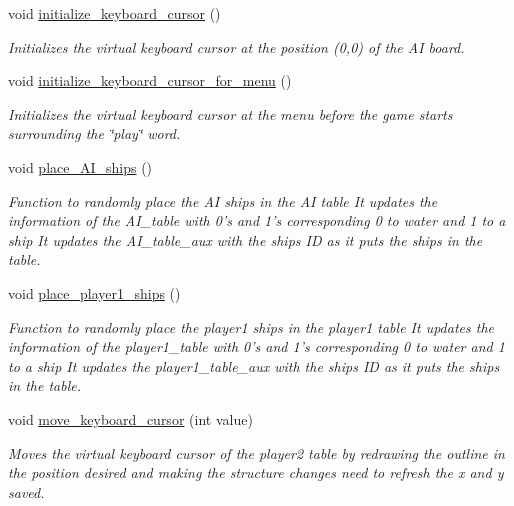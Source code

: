 \begin{DoxyCompactItemize}
void \hyperlink{group___commodore_gab4fdfb4b8f5979494e57da5386f15bd4}{initialize\-\_\-keyboard\-\_\-cursor} ()
\begin{DoxyCompactList}\small\item\em Initializes the virtual keyboard cursor at the position (0,0) of the A\-I board. \end{DoxyCompactList}\item 
void \hyperlink{group___commodore_ga4709d1c41c7f8b39baa151b117db805a}{initialize\-\_\-keyboard\-\_\-cursor\-\_\-for\-\_\-menu} ()
\begin{DoxyCompactList}\small\item\em Initializes the virtual keyboard cursor at the menu before the game starts surrounding the \char`\"{}play\char`\"{} word. \end{DoxyCompactList}\item 
void \hyperlink{group___commodore_ga383f6b0dd5befc32a3da3bbe13e182b3}{place\-\_\-\-A\-I\-\_\-ships} ()
\begin{DoxyCompactList}\small\item\em Function to randomly place the A\-I ships in the A\-I table It updates the information of the A\-I\-\_\-table with 0's and 1's corresponding 0 to water and 1 to a ship It updates the A\-I\-\_\-table\-\_\-aux with the ships I\-D as it puts the ships in the table. \end{DoxyCompactList}\item 
void \hyperlink{group___commodore_ga8ad464df0bdc299f63d9ba4f8c434fa7}{place\-\_\-player1\-\_\-ships} ()
\begin{DoxyCompactList}\small\item\em Function to randomly place the player1 ships in the player1 table It updates the information of the player1\-\_\-table with 0's and 1's corresponding 0 to water and 1 to a ship It updates the player1\-\_\-table\-\_\-aux with the ships I\-D as it puts the ships in the table. \end{DoxyCompactList}\item 
void \hyperlink{group___commodore_gae2dc1b15af70aa148fee6092135a8027}{move\-\_\-keyboard\-\_\-cursor} (int value)
\begin{DoxyCompactList}\small\item\em Moves the virtual keyboard cursor of the player2 table by redrawing the outline in the position desired and making the structure changes need to refresh the x and y saved. \end{DoxyCompactList}\item 

\end{DoxyCompactItemize}
